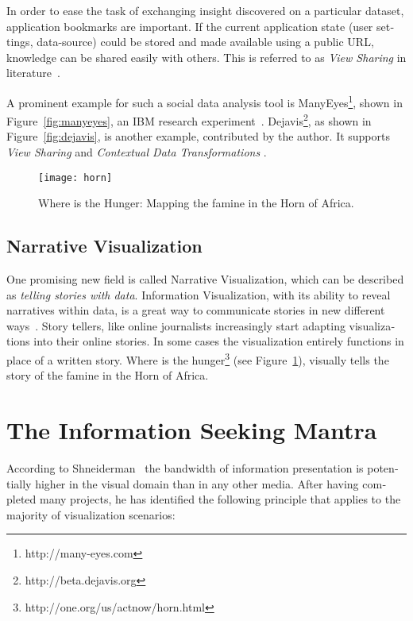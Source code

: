 \begin{english}
In order to ease the task of exchanging insight discovered on a particular dataset, application bookmarks are important. If the current application state (user settings, data-source) could be stored and made available using a public URL, knowledge can be shared easily with others. This is referred to as \emph{View Sharing} in literature~\cite{clark91}.

A prominent example for such a social data analysis tool is ManyEyes\footnote{http://many-eyes.com}, shown in Figure~\ref{fig:manyeyes}, an IBM research experiment~\cite{manyeyes}. Dejavis\footnote{http://beta.dejavis.org}, as shown in Figure~\ref{fig:dejavis}, is another example, contributed by the author. It supports \emph{View Sharing} \cite{clark91} and \emph{Contextual Data Transformations} \cite{manyeyes}.


\begin{figure}
\centering
\texttt{[image: horn]}
\caption{Where is the Hunger: Mapping the famine in the Horn of Africa.}
\label{fig:horn}
\end{figure}

\subsection{Narrative Visualization}


One promising new field is called Narrative Visualization, which can be described as \emph{telling stories with data}.  Information Visualization, with its ability to reveal narratives within data, is a great way to communicate stories in new different ways~\cite{NarrativeVis10}. Story tellers, like online journalists increasingly start adapting visualizations into their online stories. In some cases the visualization entirely functions in place of a written story. Where is the hunger\footnote{http://one.org/us/actnow/horn.html} (see Figure~\ref{fig:horn}), visually tells the story of the famine in the Horn of Africa.


\section{The Information Seeking Mantra}

According to Shneiderman~\cite{shneiderman96eyes} the bandwidth of information presentation is potentially higher in the visual domain than in any other media. After having completed many projects, he has identified the following principle that applies to the majority of visualization scenarios:


\end{english}
